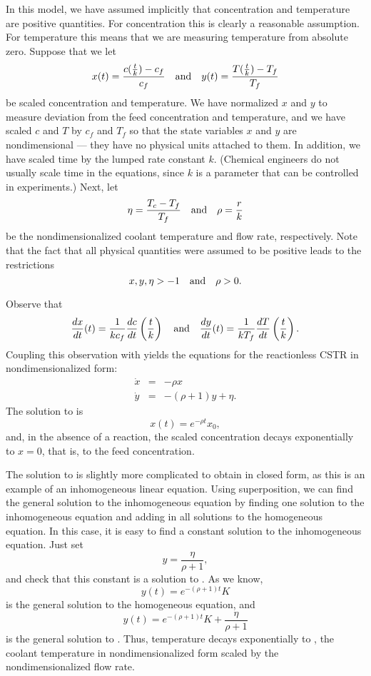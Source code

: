 \documentclass{ximera}
\begin{document}
In this model, we have assumed implicitly that concentration and
temperature are positive quantities.  For concentration this is
clearly a reasonable assumption.  For temperature this means
that we are measuring temperature from absolute zero.  Suppose
that we let  
\[
x(t) = \frac{c(\frac{t}{k})-c_f}{c_f} \quad\mbox{and}\quad 
y(t) = \frac{T(\frac{t}{k})-T_f}{T_f}
\]
be scaled concentration and temperature.  We have normalized $x$
and $y$ to measure deviation from the feed concentration and
temperature, and we have scaled $c$ and $T$ by $c_f$ and $T_f$
so that the state variables $x$ and $y$ are nondimensional ---
they have no physical units attached to them.  In addition, we
have scaled time by the lumped rate constant $k$.  (Chemical engineers
do not usually scale time in the equations, since $k$ is a 
parameter that can be controlled in experiments.) Next, let 
\[
\eta = \frac{T_c-T_f}{T_f} \quad\mbox{and}\quad \rho = \frac{r}{k}
\]
be the nondimensionalized coolant temperature and flow rate,
respectively.  Note that the fact that all physical quantities
were assumed to be positive leads to the restrictions
\[
x, y,\eta >-1  \quad\mbox{and}\quad \rho>0.
\]

Observe that 
\[
\frac{dx}{dt}(t)=\frac{1}{kc_f}\frac{dc}{dt}\left(\frac{t}{k}\right) \quad\mbox{and}\quad
\frac{dy}{dt}(t)=\frac{1}{kT_f}\frac{dT}{dt}\left(\frac{t}{k}\right).
\]
Coupling this observation with  yields the equations 
for the reactionless CSTR in nondimensionalized form:
\begin{eqnarray}
\dot{x} & = & -\rho x \label{e:ndCSTRlina} \\
\dot{y} & = & -(\rho+1)y + \eta. \label{e:ndCSTRlinb}
\end{eqnarray}
The solution to  is 
\[
x(t) = e^{-\rho t}x_0,
\]
and, in the absence of a reaction, the scaled concentration
decays exponentially to $x=0$, that is, to the feed
concentration.

The solution to  is slightly more complicated
to obtain in closed form, as this is an example of an
inhomogeneous linear equation.  Using 
superposition, we can find
the general solution to the inhomogeneous equation by finding
one solution to the inhomogeneous 
equation and adding in all
solutions to the homogeneous equation.  
In this case, it is easy to find a constant solution to the 
inhomogeneous equation.  Just set
\begin{equation}  \label{e:basetemp}
y = \frac{\eta}{\rho+1},
\end{equation}
and check that this constant is a solution to
.  As we know,
\[
y(t) = e^{-(\rho+1)t}K
\]
is the general solution to the homogeneous equation, and
\[
y(t) = e^{-(\rho+1)t}K + \frac{\eta}{\rho+1}
\]
is the general solution to .  Thus,
temperature decays exponentially to , the
coolant temperature in nondimensionalized form scaled by the
nondimensionalized flow rate.
\end{document}
